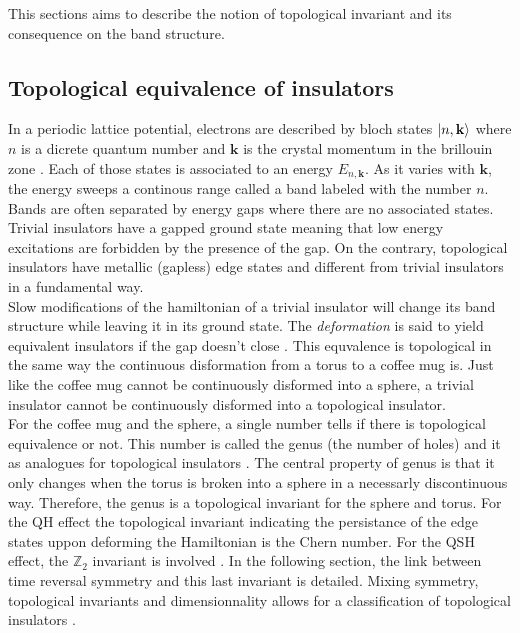 This sections aims to describe the notion of topological invariant and its consequence on the band structure. 
\subsection{Topological equivalence of insulators}
In a periodic lattice potential, electrons are described by bloch states $\ket{n, \mathbf{k}}$ where $n$ is a dicrete quantum number and $\mathbf{k}$ is the crystal momentum in the brillouin zone \cite{shankar_topological_2018}. Each of those states is associated to an energy $E_{n, \mathbf{k}}$.  As it varies with $\mathbf{k}$, the energy sweeps a continous range called a band labeled with the number $n$. Bands are often separated by energy gaps where there are no associated states. Trivial insulators have a gapped ground state meaning that low energy excitations are forbidden by the presence of the gap. On the contrary, topological insulators have metallic (gapless) edge states\cite{kane_topological_2013} and different from trivial insulators in a fundamental way.\\ 

Slow modifications of the hamiltonian of a trivial insulator will change its band structure while leaving it in its ground state. The \textit{deformation} is said to yield equivalent insulators if the gap doesn't close \cite{kane_topological_2013}. This equvalence is topological in the same way the continuous disformation from a torus to a coffee mug is. Just like the coffee mug cannot be continuously disformed into a sphere, a trivial insulator cannot be continuously disformed into a topological insulator.\\

For the coffee mug and the sphere, a single number tells if there is topological equivalence or not. This number is called the genus (the number of holes) and it as analogues for topological insulators \cite{batra_physics_2020}. The central property of genus is that it only changes when the torus is broken into a sphere in a necessarly discontinuous way. Therefore, the genus is a topological invariant for the sphere and torus. For the QH effect the topological invariant indicating the persistance of the edge states uppon deforming the Hamiltonian is the Chern number. For the QSH effect, the $\mathbb{Z}_2$ invariant is involved \cite{kane_topological_2013}. In the following section, the link between time reversal symmetry and this last invariant is detailed.  Mixing symmetry, topological invariants and dimensionnality allows for a classification of topological insulators \cite{hasan_topological_2010}. 

